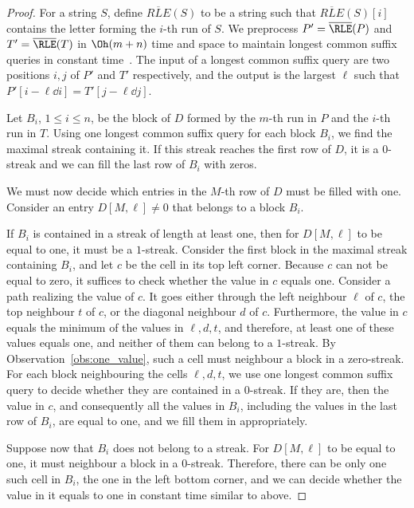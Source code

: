 \DTWone*
\begin{proof}
For a string $S$, define $\overline{RLE}(S)$ to be a string such that $\overline{RLE}(S)[i]$ contains the letter forming the $i$-th run of $S$. We preprocess $P' = \overline{\RLE}(P)$ and $T' = \overline{\RLE}(T)$ in $\Oh(m+n)$ time and space to maintain longest common suffix queries in constant time~\cite{RMQ}. The input of a longest common suffix query are two positions $i,j$ of $P'$ and $T'$ respectively, and the output is the largest $\ell$ such that $P'[i-\ell \dd i] = T'[j-\ell \dd j]$.

Let $B_i$, $1 \le i \le n$, be the block of $D$ formed by the $m$-th run in $P$ and the $i$-th run in $T$. Using one longest common suffix query for each block $B_i$, we find the maximal streak containing it. If this streak reaches the first row of $D$, it is a $0$-streak and we can fill the last row of $B_i$ with zeros. 

We must now decide which entries in the $M$-th row of $D$ must be filled with one. Consider an entry $D[M,\ell] \neq 0$ that belongs to a block $B_i$. 

If $B_i$ is contained in a streak of length at least one, then for $D[M,\ell]$ to be equal to one, it must be a $1$-streak. Consider the first block in the maximal  streak containing $B_i$, and let $c$ be the cell in its top left corner. Because $c$ can not be equal to zero, it suffices to check whether the value in $c$ equals one. Consider a path realizing the value of $c$. It goes either through the left neighbour $\ell$ of $c$, the top neighbour $t$ of $c$, or the diagonal neighbour $d$ of $c$. Furthermore, the value in $c$ equals the minimum of the values in $\ell, d, t$, and therefore, at least one of these values equals one, and neither of them can belong to a $1$-streak. By Observation~\ref{obs:one_value}, such a cell must neighbour a block in a zero-streak. For each block neighbouring the cells $\ell, d, t$, we use one longest common suffix query to decide whether they are contained in a $0$-streak. If they are, then the value in $c$, and consequently all the values in $B_i$, including the values in the last row of $B_i$, are equal to one, and we fill them in appropriately. 

Suppose now that $B_i$ does not belong to a streak. For $D[M,\ell]$ to be equal to one, it must neighbour a block in a $0$-streak. Therefore, there can be only one such cell in $B_i$, the one in the left bottom corner, and we can decide whether the value in it equals to one in constant time similar to above.
\end{proof}
